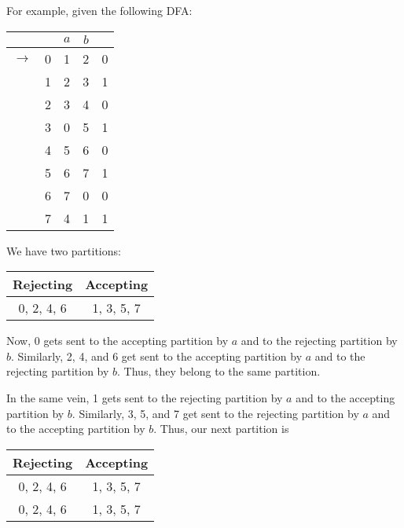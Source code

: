 For example, given the following DFA:

\begin{center}\begin{tabular}{c c| c c r}
         & & $a$ & $b$ & \\\hline
         $\to$ & 0 & 1 & 2 & 0\\
               & 1 & 2 & 3 & 1\\
               & 2 & 3 & 4 & 0\\
               & 3 & 0 & 5 & 1\\
               & 4 & 5 & 6 & 0\\
               & 5 & 6 & 7 & 1\\
               & 6 & 7 & 0 & 0\\
               & 7 & 4 & 1 & 1
    \end{tabular}\end{center}

We have two partitions:

\begin{center}\begin{tabular}{c|c|c|c|c|c|c|c}
\multicolumn{4}{c|}{Rejecting} & \multicolumn{4}{|c}{Accepting}\\\hline
\multicolumn{4}{c|}{0, 2, 4, 6} & \multicolumn{4}{|c}{1, 3, 5, 7}
\end{tabular}\end{center}

Now, 0 gets sent to the accepting partition by $a$ and to the rejecting partition by $b$. Similarly, 2, 4, and 6 get sent to the accepting partition by $a$ and to the rejecting partition by $b$. Thus, they belong to the same partition.

In the same vein, 1 gets sent to the rejecting partition by $a$ and to the accepting partition by $b$. Similarly, 3, 5, and 7 get sent to the rejecting partition by $a$ and to the accepting partition by $b$. Thus, our next partition is

\begin{center}\begin{tabular}{|c|c|c|c|c|c|c|c|}
\multicolumn{4}{|c|}{Rejecting} & \multicolumn{4}{|c|}{Accepting}\\\hline
\multicolumn{4}{|c|}{0, 2, 4, 6} & \multicolumn{4}{|c|}{1, 3, 5, 7}\\
\multicolumn{4}{|c|}{0, 2, 4, 6} & \multicolumn{4}{|c|}{1, 3, 5, 7}
\end{tabular}\end{center}


